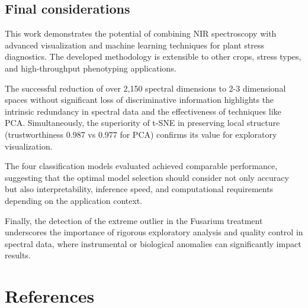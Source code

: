 \documentclass[12pt,a4paper]{article}
\begin{document}
\subsection{Final considerations}

This work demonstrates the potential of combining NIR spectroscopy with advanced visualization and machine learning techniques for plant stress diagnostics. The developed methodology is extensible to other crops, stress types, and high-throughput phenotyping applications.

The successful reduction of over 2,150 spectral dimensions to 2-3 dimensional spaces without significant loss of discriminative information highlights the intrinsic redundancy in spectral data and the effectiveness of techniques like PCA. Simultaneously, the superiority of t-SNE in preserving local structure (trustworthiness 0.987 vs 0.977 for PCA) confirms its value for exploratory visualization.

The four classification models evaluated achieved comparable performance, suggesting that the optimal model selection should consider not only accuracy but also interpretability, inference speed, and computational requirements depending on the application context.

Finally, the detection of the extreme outlier in the Fusarium treatment underscores the importance of rigorous exploratory analysis and quality control in spectral data, where instrumental or biological anomalies can significantly impact results.

\newpage
\section*{References}
\end{document}

